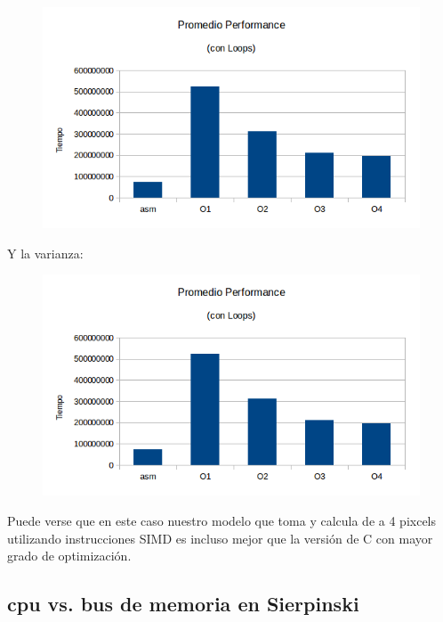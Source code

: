 \documentclass[a4paper]{article}
\begin{document}
\begin{figure}[h!]
  \begin{center}
  \includegraphics[scale=0.66]{Graficos1.4/sie/PSO.png}
  \label{nombreparareferenciar7}
  \end{center}
\end{figure}

\newpage

Y la varianza:

\begin{figure}[h!]
  \begin{center}
  \includegraphics[scale=0.66]{Graficos1.4/sie/PSO.png}
  \label{nombreparareferenciar8}
  \end{center}
\end{figure}

Puede verse que en este caso nuestro modelo que toma y calcula de a 4 pixcels utilizando instrucciones SIMD es incluso mejor que la versión de C con mayor grado de optimización.

\newpage
\subsection{cpu vs. bus de memoria en Sierpinski}
\end{document}
